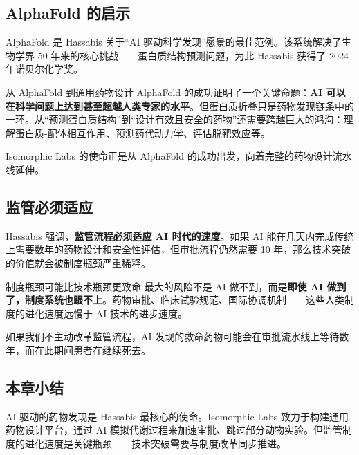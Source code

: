 \subsection{AlphaFold 的启示}

AlphaFold 是 Hassabis 关于``AI 驱动科学发现''愿景的最佳范例。该系统解决了生物学界 50 年来的核心挑战——蛋白质结构预测问题，为此 Hassabis 获得了 2024 年诺贝尔化学奖。

\begin{knowledgebox}{从 AlphaFold 到通用药物设计}
AlphaFold 的成功证明了一个关键命题：\textbf{AI 可以在科学问题上达到甚至超越人类专家的水平}。但蛋白质折叠只是药物发现链条中的一环。从``预测蛋白质结构''到``设计有效且安全的药物''还需要跨越巨大的鸿沟：理解蛋白质-配体相互作用、预测药代动力学、评估脱靶效应等。

Isomorphic Labs 的使命正是从 AlphaFold 的成功出发，向着完整的药物设计流水线延伸。
\end{knowledgebox}

\subsection{监管必须适应}

Hassabis 强调，\textbf{监管流程必须适应 AI 时代的速度}。如果 AI 能在几天内完成传统上需要数年的药物设计和安全性评估，但审批流程仍然需要 10 年，那么技术突破的价值就会被制度瓶颈严重稀释。

\begin{warningbox}{制度瓶颈可能比技术瓶颈更致命}
最大的风险不是 AI 做不到，而是\textbf{即使 AI 做到了，制度系统也跟不上}。药物审批、临床试验规范、国际协调机制——这些人类制度的进化速度远慢于 AI 技术的进步速度。

如果我们不主动改革监管流程，AI 发现的救命药物可能会在审批流水线上等待数年，而在此期间患者在继续死去。
\end{warningbox}

\subsection{本章小结}

AI 驱动的药物发现是 Hassabis 最核心的使命。Isomorphic Labs 致力于构建通用药物设计平台，通过 AI 模拟代谢过程来加速审批、跳过部分动物实验。但监管制度的进化速度是关键瓶颈——技术突破需要与制度改革同步推进。

